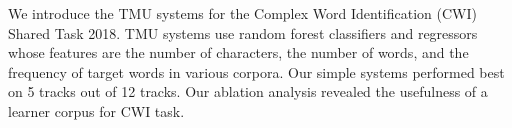 We introduce the TMU systems for the Complex Word Identification (CWI) Shared Task 2018. TMU systems use random forest classifiers and regressors whose features are the number of characters, the number of words, and the frequency of target words in various corpora. Our simple systems performed best on 5 tracks out of 12 tracks. Our ablation analysis revealed the usefulness of a learner corpus for CWI task.
